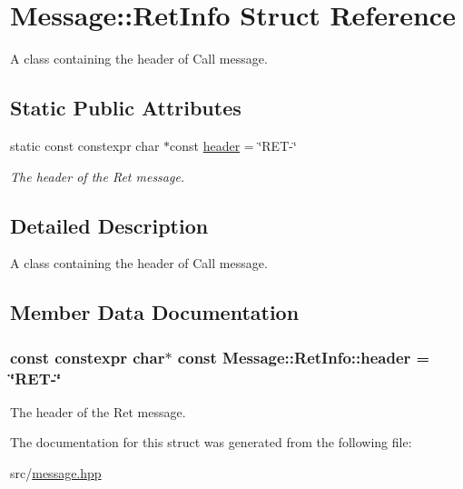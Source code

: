 \hypertarget{struct_message_1_1_ret_info}{}\section{Message\+:\+:Ret\+Info Struct Reference}
\label{struct_message_1_1_ret_info}


A class containing the header of Call message.  


\subsection*{Static Public Attributes}
\begin{DoxyCompactItemize}
\item 
static const constexpr char $\ast$const \hyperlink{struct_message_1_1_ret_info_a15d17cb758011b5e1b787a416ec8c32a}{header} = \char`\"{}R\+ET-\/\char`\"{}
\begin{DoxyCompactList}\small\item\em The header of the Ret message. \end{DoxyCompactList}\end{DoxyCompactItemize}


\subsection{Detailed Description}
A class containing the header of Call message. 

\subsection{Member Data Documentation}
\subsubsection[{\texorpdfstring{header}{header}}]{\setlength{\rightskip}{0pt plus 5cm}const constexpr char$\ast$ const Message\+::\+Ret\+Info\+::header = \char`\"{}R\+ET-\/\char`\"{}\hspace{0.3cm}{\ttfamily [static]}}\hypertarget{struct_message_1_1_ret_info_a15d17cb758011b5e1b787a416ec8c32a}{}\label{struct_message_1_1_ret_info_a15d17cb758011b5e1b787a416ec8c32a}


The header of the Ret message. 



The documentation for this struct was generated from the following file\+:\begin{DoxyCompactItemize}
\item 
src/\hyperlink{message_8hpp}{message.\+hpp}\end{DoxyCompactItemize}

